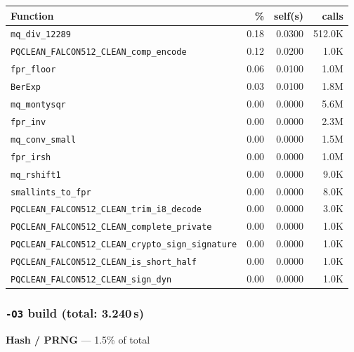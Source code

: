 \documentclass[11pt,a4paper]{article}
\begin{document}
\begin{longtable}{p{7.5cm}rrr}
\toprule
Function & \% & self(s) & calls \\
\midrule
\endhead
  \texttt{mq\_div\_12289} & 0.18 & 0.0300 & 512.0K \\
  \texttt{PQCLEAN\_FALCON512\_CLEAN\_comp\_encode} & 0.12 & 0.0200 & 1.0K \\
  \texttt{fpr\_floor} & 0.06 & 0.0100 & 1.0M \\
  \texttt{BerExp} & 0.03 & 0.0100 & 1.8M \\
  \texttt{mq\_montysqr} & 0.00 & 0.0000 & 5.6M \\
  \texttt{fpr\_inv} & 0.00 & 0.0000 & 2.3M \\
  \texttt{mq\_conv\_small} & 0.00 & 0.0000 & 1.5M \\
  \texttt{fpr\_irsh} & 0.00 & 0.0000 & 1.0M \\
  \texttt{mq\_rshift1} & 0.00 & 0.0000 & 9.0K \\
  \texttt{smallints\_to\_fpr} & 0.00 & 0.0000 & 8.0K \\
  \texttt{PQCLEAN\_FALCON512\_CLEAN\_trim\_i8\_decode} & 0.00 & 0.0000 & 3.0K \\
  \texttt{PQCLEAN\_FALCON512\_CLEAN\_complete\_private} & 0.00 & 0.0000 & 1.0K \\
  \texttt{PQCLEAN\_FALCON512\_CLEAN\_crypto\_sign\_signature} & 0.00 & 0.0000 & 1.0K \\
  \texttt{PQCLEAN\_FALCON512\_CLEAN\_is\_short\_half} & 0.00 & 0.0000 & 1.0K \\
  \texttt{PQCLEAN\_FALCON512\_CLEAN\_sign\_dyn} & 0.00 & 0.0000 & 1.0K \\
\bottomrule
\end{longtable}

\subsubsection*{\texttt{-O3} build (total: 3.240\,s)}

\noindent\colorbox{hashcolor}{\strut \textbf{Hash / PRNG} --- 1.5\% of total}
\vspace{2pt}
\end{document}
